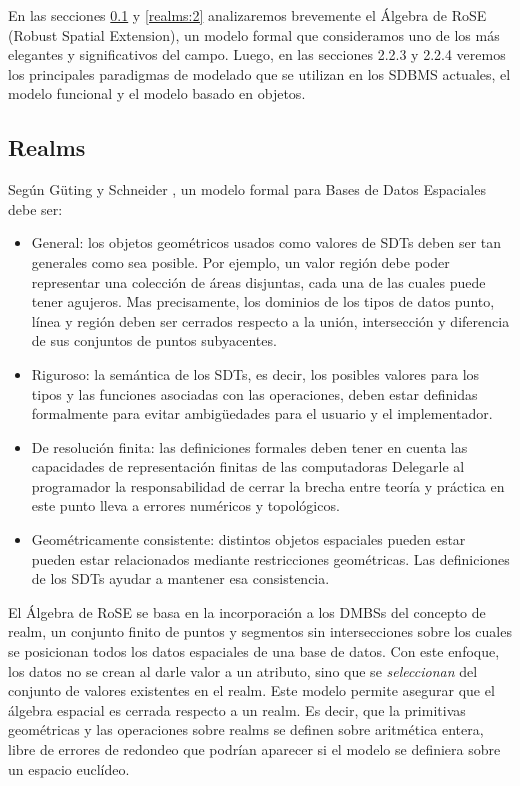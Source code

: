 En las secciones \ref{realms:1} y \ref{realms:2} analizaremos brevemente el Álgebra de RoSE \cite{rose} (Robust Spatial Extension),
un modelo formal que consideramos uno de los más elegantes y significativos del campo.
Luego, en las secciones 2.2.3 y 2.2.4 veremos los principales paradigmas de modelado que se utilizan en los SDBMS actuales,
el modelo funcional y el modelo basado en objetos.

\subsection{Realms} \label{realms:1}

Según Güting y Schneider \cite{rose}, un modelo formal para Bases de Datos Espaciales debe ser:
\begin{itemize}
    \item General: los objetos geométricos usados como valores de SDTs deben ser tan generales como sea posible.
        Por ejemplo, un valor región debe poder representar una colección de áreas disjuntas, cada una de las cuales puede tener agujeros.
        Mas precisamente, los dominios de los tipos de datos punto, línea y región deben ser cerrados respecto a la unión,
        intersección y diferencia de sus conjuntos de puntos subyacentes.
    \item Riguroso: la semántica de los SDTs, es decir, los posibles valores para los tipos y las funciones asociadas con las operaciones,
        deben estar definidas formalmente para evitar ambigüedades para el usuario y el implementador.
    \item De resolución finita: las definiciones formales deben tener en cuenta las capacidades de representación finitas de las computadoras
        Delegarle al programador la responsabilidad de cerrar la brecha entre teoría y práctica en este punto lleva a errores numéricos y topológicos.
    \item Geométricamente consistente: distintos objetos espaciales pueden estar pueden estar relacionados mediante restricciones geométricas.
        Las definiciones de los SDTs ayudar a mantener esa consistencia.
\end{itemize}

El Álgebra de RoSE se basa en la incorporación a los DMBSs del concepto de realm, un conjunto finito de puntos y segmentos sin intersecciones
sobre los cuales se posicionan todos los datos espaciales de una base de datos.
Con este enfoque, los datos no se crean al darle valor a un atributo, sino que se \emph{seleccionan} del conjunto de
valores existentes en el realm.
Este modelo permite asegurar que el álgebra espacial es cerrada respecto a un realm.
Es decir, que la primitivas geométricas y las operaciones sobre realms se definen sobre
aritmética entera, libre de errores de redondeo que podrían aparecer si el modelo se definiera sobre un espacio euclídeo.


